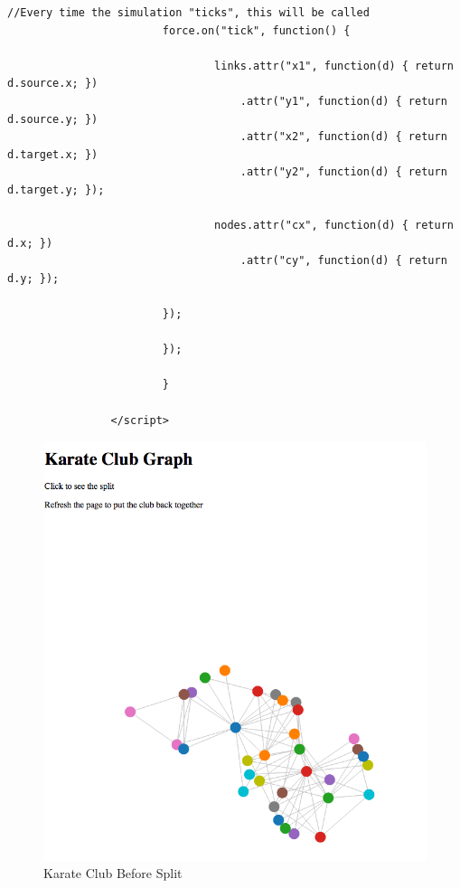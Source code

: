 \documentclass{article}
\begin{document}
\begin{lstlisting}[frame=single, caption=index.html, label=webpage]
                        //Every time the simulation "ticks", this will be called
                        force.on("tick", function() {

                                links.attr("x1", function(d) { return d.source.x; })
                                	.attr("y1", function(d) { return d.source.y; })
                                    .attr("x2", function(d) { return d.target.x; })
                                    .attr("y2", function(d) { return d.target.y; });
                        
                                nodes.attr("cx", function(d) { return d.x; })
                                    .attr("cy", function(d) { return d.y; });
        
                        });
                        
                        });
                        
                        }
  
                </script>
\end{lstlisting}

\begin{figure}[H]
\centering
\includegraphics[scale=0.50]{q1/kcbeforesplit}
\caption{Karate Club Before Split}
\label{before}
\end{figure}
\end{document}
